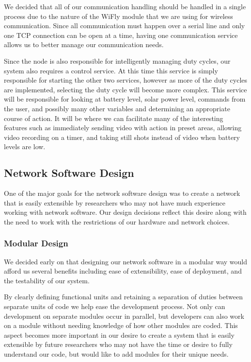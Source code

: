We decided that all of our communication handling should be handled in a single
process due to the nature of the WiFly module that we are using for wireless
communication. Since all communication must happen over a serial line and only
one TCP connection can be open at a time, having one communication service
allows us to better manage our communication needs.

Since the node is also responsible for intelligently managing duty cycles, our
system also requires a control service. At this time this service is simply
responsible for starting the other two services, however as more of the duty
cycles are implemented, selecting the duty cycle will become more complex. This
service will be responsible for looking at battery level, solar power level,
commands from the user, and possibly many other variables and determining an
appropriate course of action. It will be where we can facilitate many of the
interesting features such as immediately sending video with action in preset
areas, allowing video recording on a timer, and taking still shots instead of
video when battery levels are low.

\subsection{Network Software Design}

One of the major goals for the network software design was to create a
network that is easily extensible by researchers who may not have much
experience working with network software. Our design decisions reflect this
desire along with the need to work with the restrictions of our hardware and
network choices.

\subsubsection{Modular Design}

We decided early on that designing our network software in a modular way would
afford us several benefits including ease of extensibility, ease of deployment,
and the testability of our system.

By clearly defining functional units and retaining a separation of duties
between separate units of code we help ease the development process. Not only
can development on separate modules occur in parallel, but developers can also
work on a module without needing knowledge of how other modules are coded. This
aspect becomes more important in our desire to create a system that is easily
extensible by future researchers who may not have the time or desire to fully
understand our code, but would like to add modules for their unique needs.

